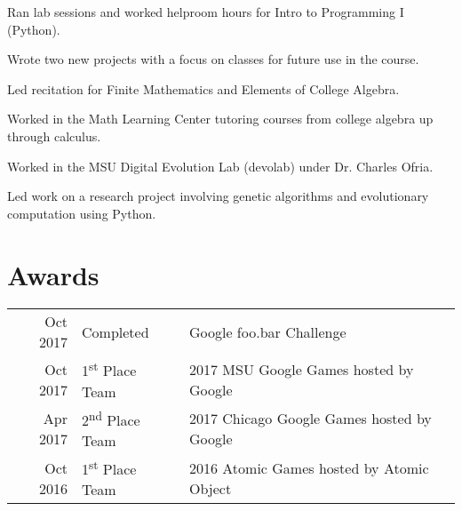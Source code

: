 \documentclass[]{deedy-resume-openfont-rileyannis}
\begin{document}
\begin{minipage}[t]{0.66\textwidth}
\begin{tightemize}
\item Ran lab sessions and worked helproom hours for Intro to Programming I (Python).
\item Wrote two new projects with a focus on classes for future use in the course.
\end{tightemize}
\sectionsep

\begin{tightemize}
\item Led recitation for Finite Mathematics and Elements of College Algebra.
\item Worked in the Math Learning Center tutoring courses from college algebra up through calculus.
\end{tightemize}
\sectionsep

\begin{tightemize}
\item Worked in the MSU Digital Evolution Lab (devolab) under Dr. Charles Ofria.
\item Led work on a research project involving genetic algorithms and evolutionary computation using Python.
\end{tightemize}
\sectionsep


\section{Awards}

\begin{tabular}{rll}
Oct 2017 & Completed & Google foo.bar Challenge\\
Oct 2017 & 1\textsuperscript{st} Place Team & 2017 MSU Google Games hosted by Google\\
Apr 2017 & 2\textsuperscript{nd} Place Team & 2017 Chicago Google Games hosted by Google\\
Oct 2016 & 1\textsuperscript{st} Place Team & 2016 Atomic Games hosted by Atomic Object\\
\end{tabular}
\sectionsep



\end{minipage}
\end{document}

